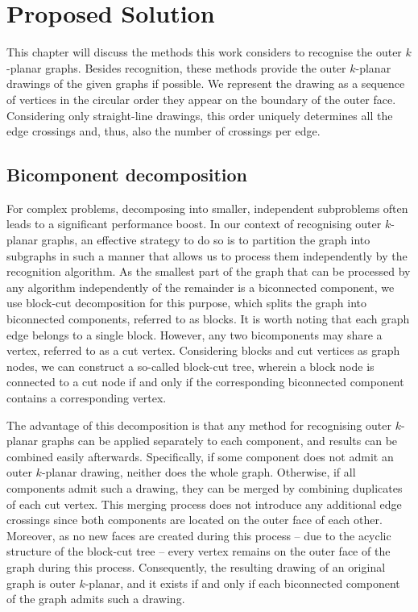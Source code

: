 \chapter{Proposed Solution}

This chapter will discuss the methods this work considers to recognise the outer \(k\)-planar graphs. Besides recognition, these methods provide the outer \(k\)-planar drawings of the given graphs if possible. We represent the drawing as a sequence of vertices in the circular order they appear on the boundary of the outer face. Considering only straight-line drawings, this order uniquely determines all the edge crossings and, thus, also the number of crossings per edge.


\section{Bicomponent decomposition}

For complex problems, decomposing into smaller, independent subproblems often leads to a significant performance boost. In our context of recognising outer \(k\)-planar graphs, an effective strategy to do so is to partition the graph into subgraphs in such a manner that allows us to process them independently by the recognition algorithm. As the smallest part of the graph that can be processed by any algorithm independently of the remainder is a biconnected component, we use block-cut decomposition for this purpose, which splits the graph into biconnected components, referred to as blocks. It is worth noting that each graph edge belongs to a single block. However, any two bicomponents may share a vertex, referred to as a cut vertex. Considering blocks and cut vertices as graph nodes, we can construct a so-called block-cut tree, wherein a block node is connected to a cut node if and only if the corresponding biconnected component contains a corresponding vertex.

The advantage of this decomposition is that any method for recognising outer \(k\)-planar graphs can be applied separately to each component, and results can be combined easily afterwards. Specifically, if some component does not admit an outer \(k\)-planar drawing, neither does the whole graph. Otherwise, if all components admit such a drawing, they can be merged by combining duplicates of each cut vertex. This merging process does not introduce any additional edge crossings since both components are located on the outer face of each other. Moreover, as no new faces are created during this process -- due to the acyclic structure of the block-cut tree -- every vertex remains on the outer face of the graph during this process. Consequently, the resulting drawing of an original graph is outer \(k\)-planar, and it exists if and only if each biconnected component of the graph admits such a drawing.

